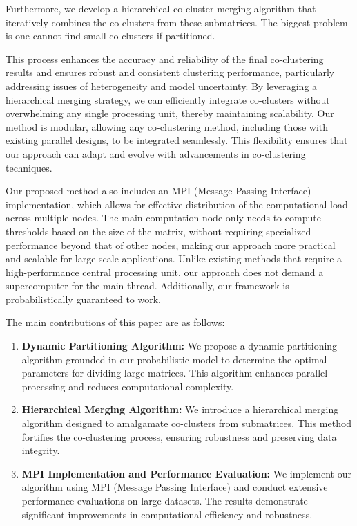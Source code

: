 \documentclass[journal]{IEEEtran}
\begin{document}
Furthermore, we develop a hierarchical co-cluster merging algorithm that iteratively combines the co-clusters from these submatrices.
The biggest problem is one cannot find small co-clusters if partitioned.

This process enhances the accuracy and reliability of the final co-clustering results and ensures robust and consistent clustering performance, particularly addressing issues of heterogeneity and model uncertainty. By leveraging a hierarchical merging strategy, we can efficiently integrate co-clusters without overwhelming any single processing unit, thereby maintaining scalability. Our method is modular, allowing any co-clustering method, including those with existing parallel designs, to be integrated seamlessly. This flexibility ensures that our approach can adapt and evolve with advancements in co-clustering techniques.

Our proposed method also includes an MPI (Message Passing Interface) implementation, which allows for effective distribution of the computational load across multiple nodes. The main computation node only needs to compute thresholds based on the size of the matrix, without requiring specialized performance beyond that of other nodes, making our approach more practical and scalable for large-scale applications. Unlike existing methods that require a high-performance central processing unit, our approach does not demand a supercomputer for the main thread. Additionally, our framework is probabilistically guaranteed to work.

The main contributions of this paper are as follows:
\begin{enumerate}
  \item \textbf{Dynamic Partitioning Algorithm:}
        We propose a dynamic partitioning algorithm grounded in our probabilistic model to determine the optimal parameters for dividing large matrices. This algorithm enhances parallel processing and reduces computational complexity.

  \item \textbf{Hierarchical Merging Algorithm:}
        We introduce a hierarchical merging algorithm designed to amalgamate co-clusters from submatrices. This method fortifies the co-clustering process, ensuring robustness and preserving data integrity.

  \item \textbf{MPI Implementation and Performance Evaluation:}
        We implement our algorithm using MPI (Message Passing Interface) and conduct extensive performance evaluations on large datasets. The results demonstrate significant improvements in computational efficiency and robustness.

\end{enumerate}
\end{document}
